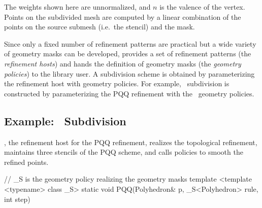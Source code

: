 
The weights shown here are unnormalized, and $n$ is the valence 
of the vertex. 
Points on the subdivided mesh are computed by a linear combination
of the points on the source submesh (i.e.~the stencil) and the mask.

Since only a fixed number of refinement patterns are 
practical but a wide variety of geometry masks can be developed,
 provides a set of refinement patterns 
(the \emph{refinement hosts})
and hands the definition of geometry masks
(the \emph{geometry policies}) to the library user.
A subdivision scheme is obtained by parameterizing the 
refinement host with geometry policies. 
For example, \CC\ subdivision is constructed by 
parameterizing the PQQ refinement with the \CC\ geometry 
policies.



\subsection{Example: \CC\ Subdivision}
, the refinement 
host for the PQQ refinement, realizes the topological 
refinement, maintains three stencils of the 
PQQ scheme, and calls policies to smooth the refined points.

\begin{ccExampleCode}
  // _S is the geometry policy realizing the geometry masks
  template <template <typename> class _S>
  static void PQQ(Polyhedron& p, _S<Polyhedron> rule, int step)
\end{ccExampleCode}


